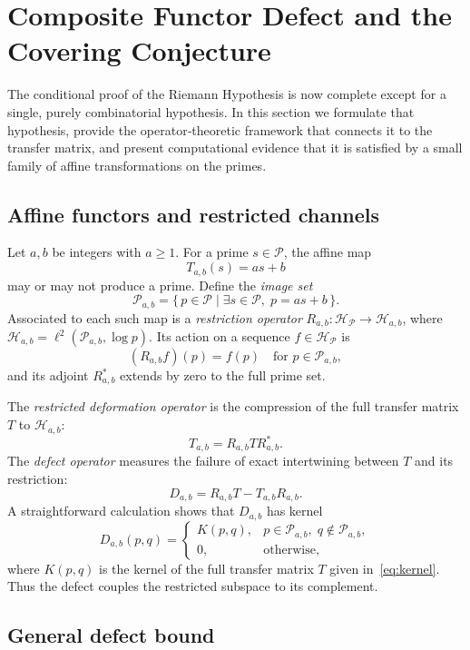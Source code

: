 \documentclass[11pt,reqno]{amsart}
\theoremstyle{definition}
\theoremstyle{remark}
\begin{document}
\section{Composite Functor Defect and the Covering Conjecture}
\label{sec:covering}

The conditional proof of the Riemann Hypothesis is now complete except for a single, purely combinatorial hypothesis.  In this section we formulate that hypothesis, provide the operator‑theoretic framework that connects it to the transfer matrix, and present computational evidence that it is satisfied by a small family of affine transformations on the primes.

\subsection{Affine functors and restricted channels}
\label{sec:affine-functors}

Let \(a,b\) be integers with \(a\ge 1\).  For a prime \(s\in\mathcal P\), the affine map
\[
T_{a,b}(s) = a s + b
\]
may or may not produce a prime.  Define the \emph{image set}
\[
\mathcal P_{a,b} = \{\,p\in\mathcal P \mid \exists s\in\mathcal P,\; p = a s + b \,\}.
\]
Associated to each such map is a \emph{restriction operator} \(R_{a,b} : \mathcal H_{\mathcal P} \to \mathcal H_{a,b}\), where \(\mathcal H_{a,b} = \ell^2(\mathcal P_{a,b}, \log p)\).  Its action on a sequence \(f\in\mathcal H_{\mathcal P}\) is
\[
(R_{a,b} f)(p) = f(p) \quad \text{for } p\in\mathcal P_{a,b},
\]
and its adjoint \(R_{a,b}^*\) extends by zero to the full prime set.

The \emph{restricted deformation operator} is the compression of the full transfer matrix \(T\) to \(\mathcal H_{a,b}\):
\[
T_{a,b} = R_{a,b} T R_{a,b}^* .
\]
The \emph{defect operator} measures the failure of exact intertwining between \(T\) and its restriction:
\[
D_{a,b} = R_{a,b} T - T_{a,b} R_{a,b}.
\]
A straightforward calculation shows that \(D_{a,b}\) has kernel
\[
D_{a,b}(p,q) = \begin{cases}
K(p,q), & p\in\mathcal P_{a,b},\; q\notin\mathcal P_{a,b},\\
0, & \text{otherwise},
\end{cases}
\]
where \(K(p,q)\) is the kernel of the full transfer matrix \(T\) given in~\eqref{eq:kernel}.  Thus the defect couples the restricted subspace to its complement.

\subsection{General defect bound}
\label{sec:defect-bound}
\end{document}
